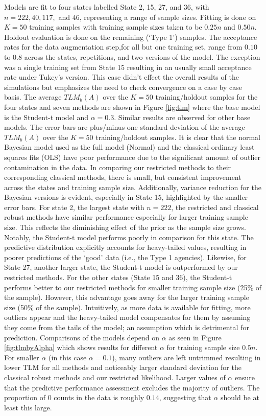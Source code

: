 \documentclass[ba]{imsart}
\newcommand{\response}[1]{{\color{blue}#1}}
\begin{document}
Models are fit to four states labelled State 2, 15, 27, and 36, with $n = 222, 40, 117,$ and $46$, representing a range of sample sizes. Fitting is done on $K = 50$ training samples with training sample sizes taken to be $0.25n$ and $0.50n$. Holdout evaluation is done on the remaining (`Type 1') samples. The acceptance rates for  the data augmentation step,\response{for all but one training set}, range from  \response{$0.10$ to $0.8$} across the states, repetitions, and two versions of the model. \response{The exception was a single training set from State 15 resulting in an usually small acceptance rate under Tukey's version. This case didn't effect the overall results of the simulations but emphasizes the need to check convergence on a case by case basis.} The average $TLM_b(A)$ over the $K = 50$ training/holdout samples for the four states and seven methods are shown in Figure \ref{fig:tlm} where the base model is the Student-t model and $\alpha = 0.3$. Similar results are observed for other base models. The error bars are plus/minus one standard deviation of the average $TLM_b(A)$ over the $K = 50$  training/holdout samples. It is clear that the normal Bayesian model used as the full model (Normal) and the classical ordinary least squares fits (OLS) have poor performance due to the significant amount of outlier contamination in the data. In comparing our restricted methods to their corresponding classical methods, there is small, but consistent improvement across the states and training sample size. Additionally, variance reduction for the Bayesian versions is evident, especially in State 15, highlighted by the smaller error bars. For state 2, the largest state with $n = 222$, the restricted and classical robust methods have similar performance especially for larger training sample size. This reflects the diminishing effect of the prior as the sample size grows. Notably, the Student-t model performs poorly in comparison for this state. The predictive distribution explicitly accounts for heavy-tailed values, resulting in poorer predictions of the `good' data (i.e., the Type 1 agencies). Likewise, for State 27, another larger state, the Student-t model is outperformed by our restricted methods.   For the other states (State 15 and 36), the Student-t performs better to our restricted methods for smaller training sample size (25\% of the sample). However, this advantage goes away for the larger training sample size (50\% of the sample). Intuitively, as more data is available for fitting, more outliers appear and the heavy-tailed model compensates for them by assuming they come from the tails of the model; an assumption which is detrimental for prediction. Comparisons of the models depend on $\alpha$ as seen in Figure \ref{fig:tlmbyAlpha} which shows results for different $\alpha$ for training sample size $0.5n$. For smaller $\alpha$ (in this case $\alpha = 0.1$), many outliers are left untrimmed resulting in lower TLM  for all methods and noticeably larger standard deviation for the classical robust methods and our restricted likelihood. Larger values of $\alpha$ ensure that the predictive performance assessment excludes the majority of outliers. The proportion of $0$ counts in the data is roughly $0.14$, suggesting that $\alpha$ should be at least this large. 
\end{document}
